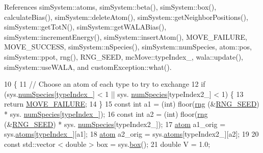 References sim\+System\+::atoms, sim\+System\+::beta(), sim\+System\+::box(), calculate\+Bias(), sim\+System\+::delete\+Atom(), sim\+System\+::get\+Neighbor\+Positions(), sim\+System\+::get\+Tot\+N(), sim\+System\+::get\+W\+A\+L\+A\+Bias(), sim\+System\+::increment\+Energy(), sim\+System\+::insert\+Atom(), M\+O\+V\+E\+\_\+\+F\+A\+I\+L\+U\+R\+E, M\+O\+V\+E\+\_\+\+S\+U\+C\+C\+E\+S\+S, sim\+System\+::n\+Species(), sim\+System\+::num\+Species, atom\+::pos, sim\+System\+::ppot, rng(), R\+N\+G\+\_\+\+S\+E\+E\+D, mc\+Move\+::type\+Index\+\_\+, wala\+::update(), sim\+System\+::use\+W\+A\+L\+A, and custom\+Exception\+::what().


\begin{DoxyCode}
10                                        \{
11                 \textcolor{comment}{// Choose an atom of each type to try to exchange}
12                 \textcolor{keywordflow}{if} (sys.\hyperlink{classsim_system_a9eea865e6dc1cff377b1e79c4d9c23f0}{numSpecies}[\hyperlink{classmc_move_acb731965547b0326ef318ec96da8b46a}{typeIndex\_}] < 1 || sys.
      \hyperlink{classsim_system_a9eea865e6dc1cff377b1e79c4d9c23f0}{numSpecies}[typeIndex2\_] < 1) \{
13                                 \textcolor{keywordflow}{return} \hyperlink{moves_8h_a9832cf5fcfa8c0894545b591c9908e39}{MOVE\_FAILURE};
14                 \}
15                 \textcolor{keyword}{const} \textcolor{keywordtype}{int} a1 = (int) floor(\hyperlink{utilities_8cpp_a0f9542af4b475ac79cb679d7a8d14db0}{rng} (&\hyperlink{global_8h_a3f4e4ea24d5a5c66feae55d1f329c884}{RNG\_SEED}) * sys.
      \hyperlink{classsim_system_a9eea865e6dc1cff377b1e79c4d9c23f0}{numSpecies}[\hyperlink{classmc_move_acb731965547b0326ef318ec96da8b46a}{typeIndex\_}]);
16                 \textcolor{keyword}{const} \textcolor{keywordtype}{int} a2 = (int) floor(\hyperlink{utilities_8cpp_a0f9542af4b475ac79cb679d7a8d14db0}{rng} (&\hyperlink{global_8h_a3f4e4ea24d5a5c66feae55d1f329c884}{RNG\_SEED}) * sys.
      \hyperlink{classsim_system_a9eea865e6dc1cff377b1e79c4d9c23f0}{numSpecies}[typeIndex2\_]);
17                 \hyperlink{classatom}{atom} a1\_orig = sys.\hyperlink{classsim_system_a90421b19082f7fb8fc23b7264b1161e4}{atoms}[\hyperlink{classmc_move_acb731965547b0326ef318ec96da8b46a}{typeIndex\_}][a1];
18                 \hyperlink{classatom}{atom} a2\_orig = sys.\hyperlink{classsim_system_a90421b19082f7fb8fc23b7264b1161e4}{atoms}[typeIndex2\_][a2];
19 
20                 \textcolor{keyword}{const} std::vector < double > box = sys.\hyperlink{classsim_system_a8bff9dfb95b1b09a0fab2c1c485ade07}{box}();
21                 \textcolor{keywordtype}{double} V = 1.0;

\end{DoxyCode}
